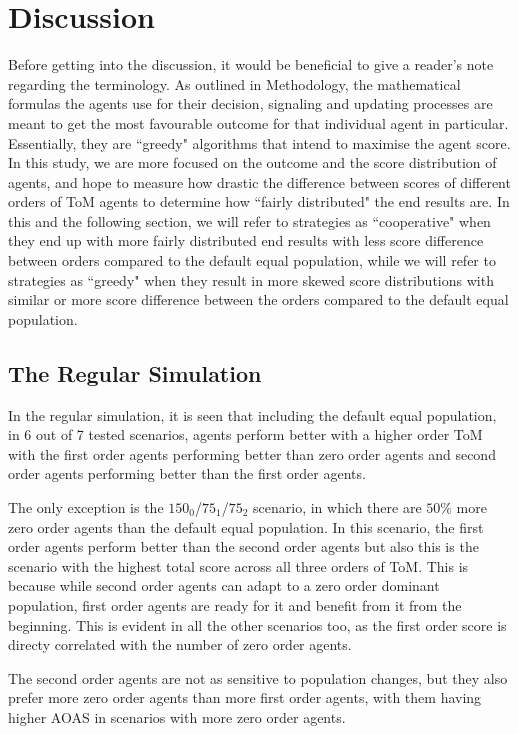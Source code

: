 \section{Discussion}\label{sec:discussion}

Before getting into the discussion, it would be beneficial to give a reader's note regarding the terminology. As outlined in Methodology, the mathematical formulas the agents use for their decision, signaling and updating processes are meant to get the most favourable outcome for that individual agent in particular. Essentially, they are ``greedy" algorithms that intend to maximise the agent score. In this study, we are more focused on the outcome and the score distribution of agents, and hope to measure how drastic the difference between scores of different orders of ToM agents to determine how ``fairly distributed" the end results are. In this and the following section, we will refer to strategies as ``cooperative" when they end up with more fairly distributed end results with less score difference between orders compared to the default equal population, while we will refer to strategies as ``greedy" when they result in more skewed score distributions with similar or more score difference between the orders compared to the default equal population.

\subsection{The Regular Simulation}

In the regular simulation, it is seen that including the default equal population, in 6 out of 7 tested scenarios, agents perform better with a higher order ToM with the first order agents performing better than zero order agents and second order agents performing better than the first order agents. 

The only exception is the $150_{0}$/$75_{1}$/$75_{2}$ scenario, in which there are $50\%$ more zero order agents than the default equal population. In this scenario, the first order agents perform better than the second order agents but also this is the scenario with the highest total score across all three orders of ToM. This is because while second order agents can adapt to a zero order dominant population, first order agents are ready for it and benefit from it from the beginning. This is evident in all the other scenarios too, as the first order score is directy correlated with the number of zero order agents. 

The second order agents are not as sensitive to population changes, but they also prefer more zero order agents than more first order agents, with them having higher AOAS in scenarios with more zero order agents.

